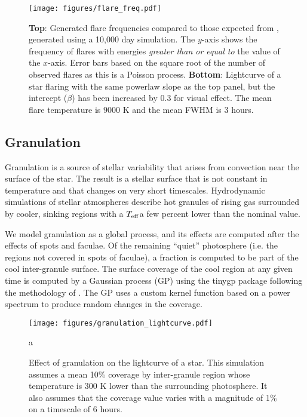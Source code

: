 \documentclass[twocolumn]{aastex631}
\newcommand{\teff}{$T_{\rm eff}$}
\begin{document}
\begin{figure}
    \centering
    \texttt{[image: figures/flare\_freq.pdf]}
    \caption{
        {\bf Top}: Generated flare frequencies compared to those expected from \citet{gao2022}, generated using a 10,000 day simulation.
        The $y$-axis shows the frequency of flares with energies {\em greater than or equal to} the value of the $x$-axis. Error bars
        based on the square root of the number of observed flares as this is a Poisson process.
        {\bf Bottom}: Lightcurve of a star flaring with the same powerlaw slope as the top panel, but the intercept ($\beta$) has been increased by 0.3
        for visual effect. The mean flare temperature is $9000$ K and the mean FWHM is $3$ hours.
        }
    \label{fig:flare_freq}
\end{figure}

\subsection{Granulation}
Granulation is a source of stellar variability that arises from convection near the surface of the star.
The result is a stellar surface that is not constant in temperature and that changes on very short timescales.
Hydrodynamic simulations of stellar atmospheres \citep[e.g.][]{magic2014} describe hot granules of rising gas surrounded by cooler,
sinking regions with a \teff a few percent lower than the nominal value.

We model granulation as a global process, and its effects are computed after the effects of spots and faculae.
Of the remaining ``quiet'' photosphere (i.e. the regions not covered in spots of faculae), a fraction is computed to be part of the cool
inter-granule surface. The surface coverage of the cool region at any given time is computed by a Gaussian process (GP) using
the {\sc tinygp} package \citep{foreman-mackey2024} following the methodology of \citet{gordon2020}.
The GP uses a custom kernel function based on a power spectrum \citep{anderson1990,kallinger2014} to produce random changes in the coverage.

\begin{figure}
    \centering
    \texttt{[image: figures/granulation\_lightcurve.pdf]}
    \caption{
        Effect of granulation on the lightcurve of a star. This simulation assumes a mean
        10\% coverage by inter-granule region whose temperature is 300 K lower than the surrounding photosphere.
        It also assumes that the coverage value varies with a magnitude of 1\% on a timescale of 6 hours.
        }
    \label{fig:gran_lc}
a\end{figure}
\end{document}
